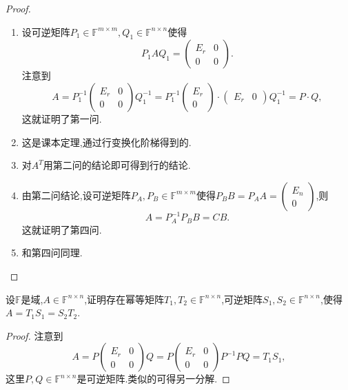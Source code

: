 \documentclass[../../main.tex]{subfiles}
\begin{document}
\begin{proof}
\begin{enumerate}
\item 设可逆矩阵\( P_1 \in \mathbb{F}^{m \times m}, Q_1 \in \mathbb{F}^{n \times n} \)使得
\[
P_1 A Q_1 = \begin{pmatrix} E_r & 0 \\ 0 & 0 \end{pmatrix}.
\]
注意到
\[
A = P_1^{-1} \begin{pmatrix} E_r & 0 \\ 0 & 0 \end{pmatrix} Q_1^{-1} = P_1^{-1} \begin{pmatrix} E_r \\ 0 \end{pmatrix} \cdot \begin{pmatrix} E_r & 0 \end{pmatrix} Q_1^{-1} = P \cdot Q,
\]
这就证明了第一问.

\item 这是课本定理,通过行变换化阶梯得到的.

\item 对\( A^T \)用第二问的结论即可得到行的结论.

\item 由第二问结论,设可逆矩阵\( P_A, P_B \in \mathbb{F}^{m \times m} \)使得\( P_B B = P_A A = \begin{pmatrix} E_n \\ 0 \end{pmatrix} \),则
\[
A = P_A^{-1} P_B B = CB.
\]
这就证明了第四问.

\item 和第四问同理.
\end{enumerate}

\end{proof}

\begin{theorem}[幂等分解]\label{theorem:幂等分解}
设\( \mathbb{F} \)是域,\( A \in \mathbb{F}^{n \times n} \),证明存在幂等矩阵\( T_1, T_2 \in \mathbb{F}^{n \times n} \),可逆矩阵\( S_1, S_2 \in \mathbb{F}^{n \times n} \),使得\( A = T_1 S_1 = S_2 T_2 \).
\end{theorem}
\begin{proof}
注意到
\[
A = P \begin{pmatrix} E_r & 0 \\ 0 & 0 \end{pmatrix} Q = P \begin{pmatrix} E_r & 0 \\ 0 & 0 \end{pmatrix} P^{-1} PQ = T_1 S_1,
\]
这里\( P, Q \in \mathbb{F}^{n \times n} \)是可逆矩阵.类似的可得另一分解.

\end{proof}
\end{document}
